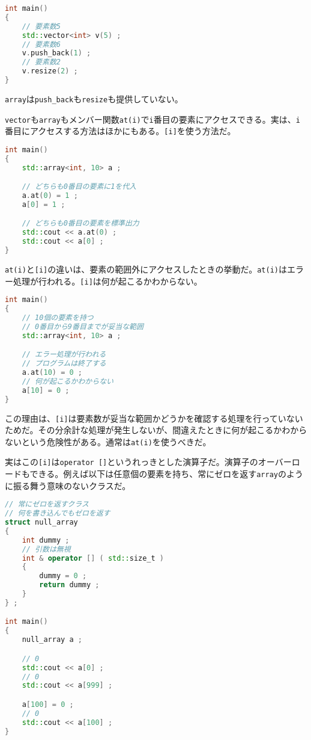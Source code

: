 \begin{lstlisting}[language={C++}]
int main()
{
    // 要素数5
    std::vector<int> v(5) ;
    // 要素数6
    v.push_back(1) ;
    // 要素数2
    v.resize(2) ;
}
\end{lstlisting}

\texttt{array}は\texttt{push\_back}も\texttt{resize}も提供していない。

\texttt{vector}も\texttt{array}もメンバー関数\texttt{at(i)}で\texttt{i}番目の要素にアクセスできる。実は、\texttt{i}番目にアクセスする方法はほかにもある。\texttt{[i]}を使う方法だ。

\begin{lstlisting}[language={C++}]
int main()
{
    std::array<int, 10> a ;

    // どちらも0番目の要素に1を代入
    a.at(0) = 1 ;
    a[0] = 1 ;

    // どちらも0番目の要素を標準出力
    std::cout << a.at(0) ;
    std::cout << a[0] ;
}
\end{lstlisting}

\texttt{at(i)}と\texttt{[i]}の違いは、要素の範囲外にアクセスしたときの挙動だ。\texttt{at(i)}はエラー処理が行われる。\texttt{[i]}は何が起こるかわからない。

\begin{lstlisting}[language={C++}]
int main()
{
    // 10個の要素を持つ
    // 0番目から9番目までが妥当な範囲
    std::array<int, 10> a ;

    // エラー処理が行われる
    // プログラムは終了する
    a.at(10) = 0 ;
    // 何が起こるかわからない
    a[10] = 0 ;
}
\end{lstlisting}

この理由は、\texttt{[i]}は要素数が妥当な範囲かどうかを確認する処理を行っていないためだ。その分余計な処理が発生しないが、間違えたときに何が起こるかわからないという危険性がある。通常は\texttt{at(i)}を使うべきだ。

実はこの\texttt{[i]}は\texttt{operator []}というれっきとした演算子だ。演算子のオーバーロードもできる。例えば以下は任意個の要素を持ち、常にゼロを返す\texttt{array}のように振る舞う意味のないクラスだ。

\begin{lstlisting}[language={C++}]
// 常にゼロを返すクラス
// 何を書き込んでもゼロを返す
struct null_array
{
    int dummy ;
    // 引数は無視
    int & operator [] ( std::size_t )
    {
        dummy = 0 ;
        return dummy ;
    }
} ;

int main()
{
    null_array a ;

    // 0
    std::cout << a[0] ;
    // 0
    std::cout << a[999] ;

    a[100] = 0 ;
    // 0
    std::cout << a[100] ;
}
\end{lstlisting}


